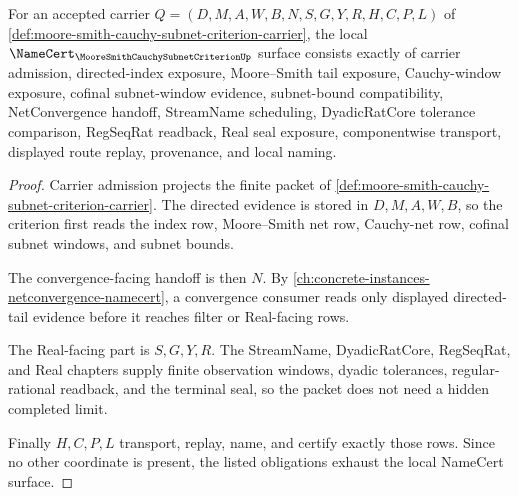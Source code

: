 \begin{theorem}
\label{thm:moore-smith-cauchy-subnet-criterion-namecert-obligations}
For an accepted carrier $Q=(D,M,A,W,B,N,S,G,Y,R,H,C,P,L)$ of \autoref{def:moore-smith-cauchy-subnet-criterion-carrier}, the local $\NameCert_{\MooreSmithCauchySubnetCriterionUp}$ surface consists exactly of carrier admission, directed-index exposure, Moore--Smith tail exposure, Cauchy-window exposure, cofinal subnet-window evidence, subnet-bound compatibility, NetConvergence handoff, StreamName scheduling, DyadicRatCore tolerance comparison, RegSeqRat readback, Real seal exposure, componentwise transport, displayed route replay, provenance, and local naming.
\end{theorem}
\begin{proof}
Carrier admission projects the finite packet of \autoref{def:moore-smith-cauchy-subnet-criterion-carrier}. The directed evidence is stored in $D,M,A,W,B$, so the criterion first reads the index row, Moore--Smith net row, Cauchy-net row, cofinal subnet windows, and subnet bounds.

The convergence-facing handoff is then $N$. By \autoref{ch:concrete-instances-netconvergence-namecert}, a convergence consumer reads only displayed directed-tail evidence before it reaches filter or Real-facing rows.

The Real-facing part is $S,G,Y,R$. The StreamName, DyadicRatCore, RegSeqRat, and Real chapters supply finite observation windows, dyadic tolerances, regular-rational readback, and the terminal seal, so the packet does not need a hidden completed limit.

Finally $H,C,P,L$ transport, replay, name, and certify exactly those rows. Since no other coordinate is present, the listed obligations exhaust the local NameCert surface.
\end{proof}

